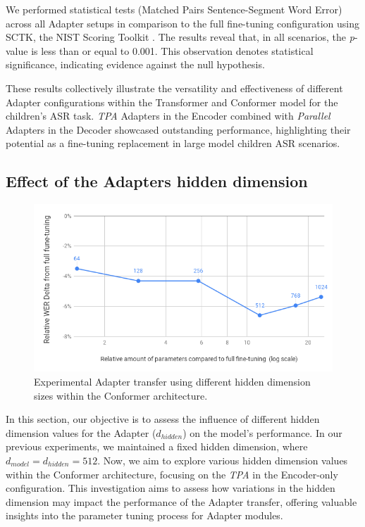We performed statistical tests (Matched Pairs Sentence-Segment Word Error) across all Adapter setups in comparison to the full fine-tuning configuration using SCTK, the NIST Scoring Toolkit \cite{SCTK_nist}. 
The results reveal that, in all scenarios, the \textit{p}-value is less than or equal to 0.001. This observation denotes statistical significance, indicating evidence against the null hypothesis. 

These results collectively illustrate the versatility and effectiveness of different Adapter configurations within the Transformer and  Conformer model for the children's \ac{ASR} task. \textit{\ac{TPA}} Adapters in the Encoder combined with \textit{Parallel} Adapters in the Decoder showcased outstanding performance, highlighting their potential as a fine-tuning replacement in large model children \ac{ASR} scenarios.

\subsection{Effect of the Adapters hidden dimension}
\label{sec:hidden_size_adapter}
\begin{figure}
    \begin{center}
    \includegraphics[scale=0.5]{imgs/HiddenDimEXP.png}
    \caption{Experimental Adapter transfer using different hidden dimension sizes within the Conformer architecture.}
    \label{fig:HiddenDim}    
\end{center}
    
\end{figure}

In this section, our objective is to assess the influence of different hidden dimension values for the Adapter ($d_{hidden}$) on the model's performance. In our previous experiments, we maintained a fixed hidden dimension, where $d_{model} = d_{hidden} = 512$. Now, we aim to explore various hidden dimension values within the Conformer architecture, focusing on the \textit{\ac{TPA}} in the Encoder-only configuration. This investigation aims to assess how variations in the hidden dimension may impact the performance of the Adapter transfer, offering valuable insights into the parameter tuning process for Adapter modules.

